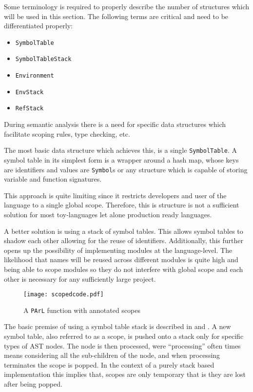 Some terminology is required to properly describe the number of
structures which will be used in this section. The following
terms are critical and need to be differentiated properly:

\begin{itemize}
    \item \texttt{SymbolTable}
    \item \texttt{SymbolTableStack}
    \item \texttt{Environment}
    \item \texttt{EnvStack}
    \item \texttt{RefStack}
\end{itemize}

During semantic analysis there is a need for specific data
structures which facilitate scoping rules, type checking, etc.

The most basic data structure which achieves this, is a single
\texttt{SymbolTable}. A symbol table in its simplest form is a
wrapper around a hash map, whose keys are identifiers and values
are \texttt{Symbol}s or any structure which is capable of
storing variable and function signatures.

This approach is quite limiting since it restricts developers
and user of the language to a single global scope. Therefore,
this is structure is not a sufficient solution for most
toy-languages let alone production ready languages.

A better solution is using a stack of symbol tables. This allows
symbol tables to shadow each other allowing for the reuse of
identifiers. Additionally, this further opens up the possibility
of implementing modules at the language-level. The likelihood
that names will be reused across different modules is quite high
and being able to scope modules so they do not interfere with
global scope and each other is necessary for any sufficiently
large project.

\begin{figure}[H]
\centering
\begin{mdframed}[backgroundcolor=UMPaleRed]
\texttt{[image: scopedcode.pdf]}
\end{mdframed}
\caption{A \texttt{PArL} function with annotated scopes}
\label{fig:scopeannotatedcode}
\end{figure}

The basic premise of using a symbol table stack is described in
 and .
A new symbol table, also referred to as a scope, is pushed onto
a stack only for specific types of AST nodes. The node is then
processed, were ``processing'' often times means considering all
the sub-children of the node, and when processing terminates the
scope is popped. In the context of a purely stack based
implementation this implies that, scopes are only temporary that
is they are lost after being popped.

